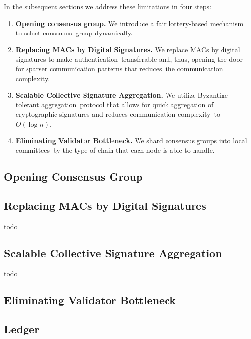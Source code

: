 In the subsequent sections we address these limitations in four steps:
\begin{enumerate}
    \item \textbf{Opening consensus group.} We introduce a fair lottery-based mechanism to select consensus\
    group dynamically.
    \item \textbf{Replacing MACs by Digital Signatures.} We replace MACs by digital signatures to make authentication\
    transferable and, thus, opening the door for sparser communication patterns that reduces\
    the communication complexity.
    \item \textbf{Scalable Collective Signature Aggregation.} We utilize Byzantine-tolerant aggregation\
    protocol that allows for quick aggregation of cryptographic signatures and reduces communication complexity\
    to $O(\log n)$.
    \item \textbf{Eliminating Validator Bottleneck.} We shard consensus groups into local committees\
    by the type of chain that each node is able to handle.
\end{enumerate}

\subsection{Opening Consensus Group}\label{subsec:opening-consensus-group}


\subsection{Replacing MACs by Digital Signatures}\label{subsec:replacing-macs-by-digital-signatures}

todo

\subsection{Scalable Collective Signature Aggregation}\label{subsec:scalable-collective-signature-aggregation}

todo

\subsection{Eliminating Validator Bottleneck}\label{subsec:eliminating-validator-bottleneck}


\subsection{Ledger}\label{subsec:ledger}


